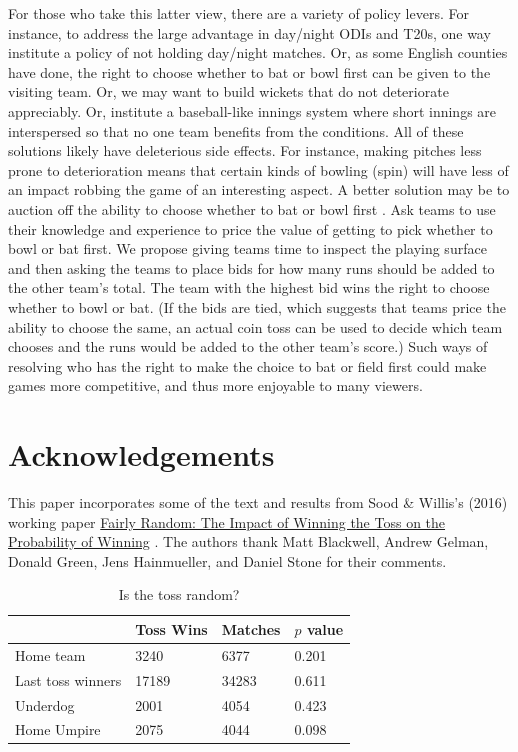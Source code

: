 \documentclass[12pt, letterpaper]{article}
\begin{document}
For those who take this latter view, there are a variety of policy levers. For instance, to address the large advantage in day/night ODIs and T20s, one way institute a policy of not holding day/night matches. Or, as some English counties have done, the right to choose whether to bat or bowl first can be given to the visiting team. Or, we may want to build wickets that do not deteriorate appreciably. Or, institute a baseball-like innings system where short innings are interspersed so that no one team benefits from the conditions. All of these solutions likely have deleterious side effects. For instance, making pitches less prone to deterioration means that certain kinds of bowling (spin) will have less of an impact robbing the game of an interesting aspect. A better solution may be to auction off the ability to choose whether to bat or bowl first \citep{sood2021}. Ask teams to use their knowledge and experience to price the value of getting to pick whether to bowl or bat first. We propose giving teams time to inspect the playing surface and then asking the teams to place bids for how many runs should be added to the other team's total. The team with the highest bid wins the right to choose whether to bowl or bat. (If the bids are tied, which suggests that teams price the ability to choose the same, an actual coin toss can be used to decide which team chooses and the runs would be added to the other team's score.) Such ways of resolving who has the right to make the choice to bat or field first could make games more competitive, and thus more enjoyable to many viewers. 

\section*{Acknowledgements}
This paper incorporates some of the text and results from Sood \& Willis's (2016) working paper \href{https://arxiv.org/abs/1605.08753}{Fairly Random: The Impact of Winning the Toss on the Probability of Winning} \citep{sood2016fairly}. The authors thank Matt Blackwell, Andrew Gelman, Donald Green, Jens Hainmueller, and Daniel Stone for their comments.
\newpage



\clearpage

\begin{table}[htb!]\centering
\caption{Is the toss random? \label{table: balance}}
\begin{tabular}{llll}
\hline
 & Toss Wins & Matches & $p$ value\\ \hline
Home team & 3240 & 6377 & 0.201\\
Last toss winners & 17189 & 34283 & 0.611\\
Underdog & 2001 & 4054 & 0.423\\
Home Umpire &  2075	& 4044	& 0.098 \\ \hline
\end{tabular}
\end{table}
\end{document}
